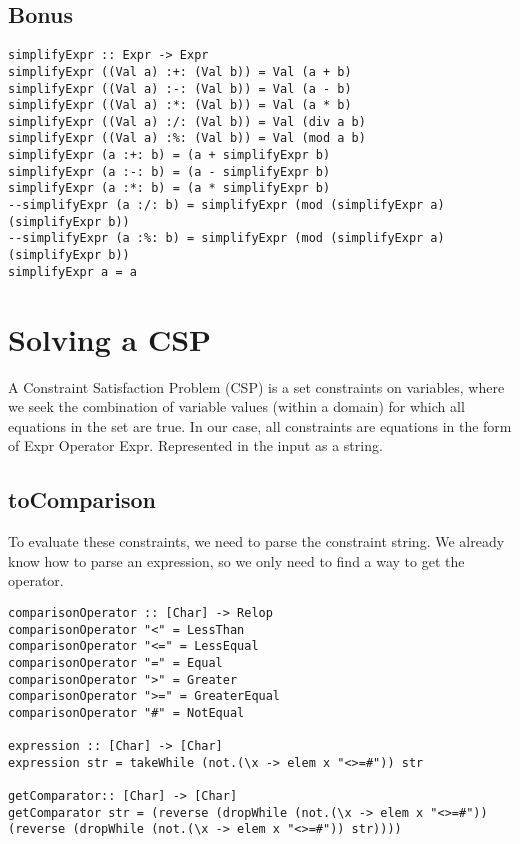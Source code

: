 \documentclass[a4paper,11pt]{article}
\begin{document}
\subsection{Bonus}
\begin{lstlisting}
simplifyExpr :: Expr -> Expr
simplifyExpr ((Val a) :+: (Val b)) = Val (a + b)
simplifyExpr ((Val a) :-: (Val b)) = Val (a - b)
simplifyExpr ((Val a) :*: (Val b)) = Val (a * b)
simplifyExpr ((Val a) :/: (Val b)) = Val (div a b)
simplifyExpr ((Val a) :%: (Val b)) = Val (mod a b)
simplifyExpr (a :+: b) = (a + simplifyExpr b)
simplifyExpr (a :-: b) = (a - simplifyExpr b)
simplifyExpr (a :*: b) = (a * simplifyExpr b)
--simplifyExpr (a :/: b) = simplifyExpr (mod (simplifyExpr a) (simplifyExpr b))
--simplifyExpr (a :%: b) = simplifyExpr (mod (simplifyExpr a) (simplifyExpr b))
simplifyExpr a = a

\end{lstlisting}

\section{Solving a CSP}

A Constraint Satisfaction Problem (CSP) is a set constraints on variables,  where we seek the combination of variable values (within a domain) for which all equations in the set are true. In our case, all constraints are equations in the form of Expr Operator Expr. Represented in the input as a string. 

\subsection{toComparison}

To evaluate these constraints, we need to parse the constraint string. We already know how to parse an expression, so we only need to find a way to get the operator.

\begin{lstlisting}
comparisonOperator :: [Char] -> Relop
comparisonOperator "<" = LessThan
comparisonOperator "<=" = LessEqual
comparisonOperator "=" = Equal
comparisonOperator ">" = Greater
comparisonOperator ">=" = GreaterEqual
comparisonOperator "#" = NotEqual

expression :: [Char] -> [Char]
expression str = takeWhile (not.(\x -> elem x "<>=#")) str

getComparator:: [Char] -> [Char]
getComparator str = (reverse (dropWhile (not.(\x -> elem x "<>=#")) (reverse (dropWhile (not.(\x -> elem x "<>=#")) str))))

\end{lstlisting}
\end{document}
